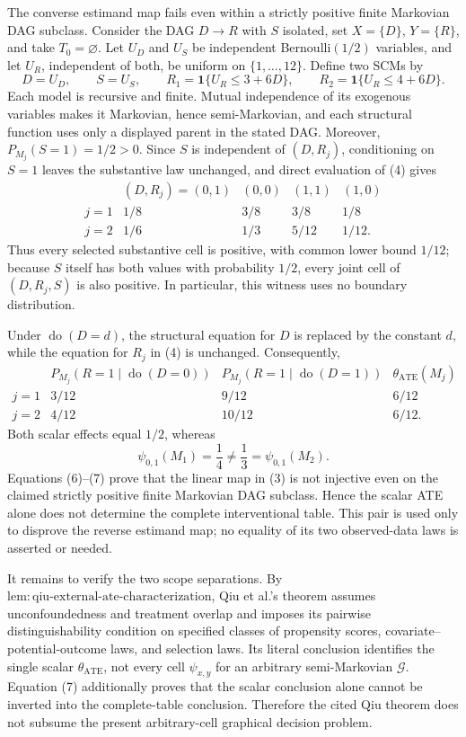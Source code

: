 {The converse estimand map fails even within a strictly positive finite Markovian DAG subclass.  Consider the DAG \(D\to R\) with \(S\) isolated, set \(X=\{D\}\), \(Y=\{R\}\), and take \(T_0=\varnothing\).  Let \(U_D\) and \(U_S\) be independent Bernoulli\((1/2)\) variables, and let \(U_R\), independent of both, be uniform on \(\{1,\ldots,12\}\).  Define two SCMs by
\[
D=U_D,\qquad S=U_S,
\qquad
R_1=\mathbf 1\{U_R\le 3+6D\},
\qquad
R_2=\mathbf 1\{U_R\le 4+6D\}.
\tag{4}
\]
Each model is recursive and finite.  Mutual independence of its exogenous variables makes it Markovian, hence semi-Markovian, and each structural function uses only a displayed parent in the stated DAG.  Moreover, \(P_{M_j}(S=1)=1/2>0\).  Since \(S\) is independent of \((D,R_j)\), conditioning on \(S=1\) leaves the substantive law unchanged, and direct evaluation of (4) gives
\[
\begin{array}{c|cccc}
& (D,R_j)=(0,1)&(0,0)&(1,1)&(1,0)\\ \hline
j=1&1/8&3/8&3/8&1/8\\
j=2&1/6&1/3&5/12&1/12.
\end{array}
\tag{5}
\]
Thus every selected substantive cell is positive, with common lower bound \(1/12\); because \(S\) itself has both values with probability \(1/2\), every joint cell of \((D,R_j,S)\) is also positive.  In particular, this witness uses no boundary distribution.

Under \(\operatorname{do}(D=d)\), the structural equation for \(D\) is replaced by the constant \(d\), while the equation for \(R_j\) in (4) is unchanged.  Consequently,
\[
\begin{array}{c|cc|c}
&P_{M_j}(R=1\mid\operatorname{do}(D=0))
&P_{M_j}(R=1\mid\operatorname{do}(D=1))
&\theta_{\mathrm{ATE}}(M_j)\\ \hline
j=1&3/12&9/12&6/12\\
j=2&4/12&10/12&6/12.
\end{array}
\tag{6}
\]
Both scalar effects equal \(1/2\), whereas
\[
\psi_{0,1}(M_1)=\frac14\ne\frac13=\psi_{0,1}(M_2).
\tag{7}
\]
Equations (6)--(7) prove that the linear map in (3) is not injective even on the claimed strictly positive finite Markovian DAG subclass.  Hence the scalar ATE alone does not determine the complete interventional table.  This pair is used only to disprove the reverse estimand map; no equality of its two observed-data laws is asserted or needed.

It remains to verify the two scope separations.  By \(\mathrm{lem{:}qiu\text{-}external\text{-}ate\text{-}characterization}\), Qiu et al.'s theorem assumes unconfoundedness and treatment overlap and imposes its pairwise distinguishability condition on specified classes of propensity scores, covariate--potential-outcome laws, and selection laws.  Its literal conclusion identifies the single scalar \(\theta_{\mathrm{ATE}}\), not every cell \(\psi_{x,y}\) for an arbitrary semi-Markovian \(\mathcal G\).  Equation (7) additionally proves that the scalar conclusion alone cannot be inverted into the complete-table conclusion.  Therefore the cited Qiu theorem does not subsume the present arbitrary-cell graphical decision problem.

}
